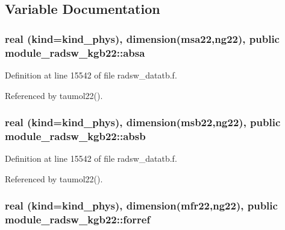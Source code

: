 \subsection{Variable Documentation}
\subsubsection[{\texorpdfstring{absa}{absa}}]{\setlength{\rightskip}{0pt plus 5cm}real (kind=kind\+\_\+phys), dimension({\bf msa22},ng22), public module\+\_\+radsw\+\_\+kgb22\+::absa}\hypertarget{namespacemodule__radsw__kgb22_a15ed79e7136ed6d7f11c19a81281af53}{}\label{namespacemodule__radsw__kgb22_a15ed79e7136ed6d7f11c19a81281af53}


Definition at line 15542 of file radsw\+\_\+datatb.\+f.



Referenced by taumol22().

\subsubsection[{\texorpdfstring{absb}{absb}}]{\setlength{\rightskip}{0pt plus 5cm}real (kind=kind\+\_\+phys), dimension({\bf msb22},ng22), public module\+\_\+radsw\+\_\+kgb22\+::absb}\hypertarget{namespacemodule__radsw__kgb22_a60403e7d343c85e965f3507b0db0f2a5}{}\label{namespacemodule__radsw__kgb22_a60403e7d343c85e965f3507b0db0f2a5}


Definition at line 15542 of file radsw\+\_\+datatb.\+f.



Referenced by taumol22().

\subsubsection[{\texorpdfstring{forref}{forref}}]{\setlength{\rightskip}{0pt plus 5cm}real (kind=kind\+\_\+phys), dimension({\bf mfr22},ng22), public module\+\_\+radsw\+\_\+kgb22\+::forref}\hypertarget{namespacemodule__radsw__kgb22_a509916fac772945555a1b3fd0d002c93}{}\label{namespacemodule__radsw__kgb22_a509916fac772945555a1b3fd0d002c93}


